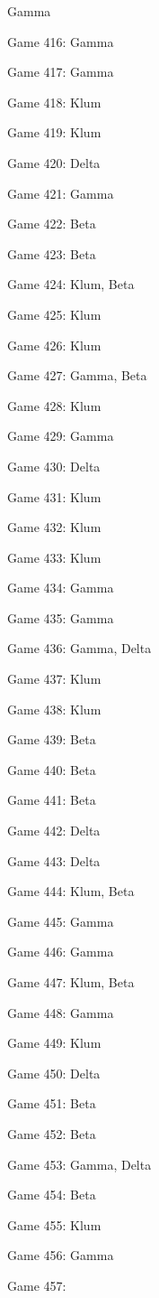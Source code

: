 \documentclass{article}
\begin{document}
\begin{multicols}{3}
\begin{compactitem}
Gamma
\item Game 416:
Gamma
\item Game 417:
Gamma
\item Game 418:
Klum
\item Game 419:
Klum
\item Game 420:
Delta
\item Game 421:
Gamma
\item Game 422:
Beta
\item Game 423:
Beta
\item Game 424:
Klum, Beta
\item Game 425:
Klum
\item Game 426:
Klum
\item Game 427:
Gamma, Beta
\item Game 428:
Klum
\item Game 429:
Gamma
\item Game 430:
Delta
\item Game 431:
Klum
\item Game 432:
Klum
\item Game 433:
Klum
\item Game 434:
Gamma
\item Game 435:
Gamma
\item Game 436:
Gamma, Delta
\item Game 437:
Klum
\item Game 438:
Klum
\item Game 439:
Beta
\item Game 440:
Beta
\item Game 441:
Beta
\item Game 442:
Delta
\item Game 443:
Delta
\item Game 444:
Klum, Beta
\item Game 445:
Gamma
\item Game 446:
Gamma
\item Game 447:
Klum, Beta
\item Game 448:
Gamma
\item Game 449:
Klum
\item Game 450:
Delta
\item Game 451:
Beta
\item Game 452:
Beta
\item Game 453:
Gamma, Delta
\item Game 454:
Beta
\item Game 455:
Klum
\item Game 456:
Gamma
\item Game 457:

\end{compactitem}
\end{multicols}
\end{document}
